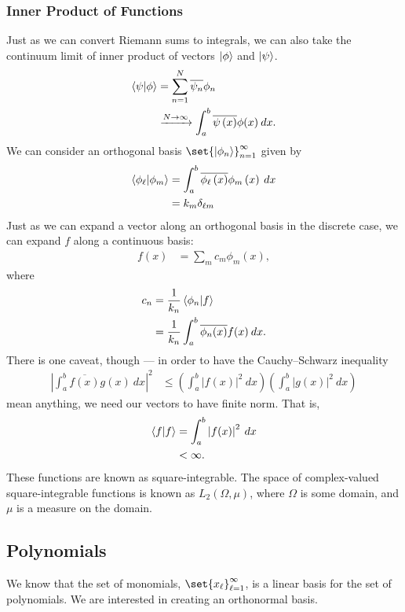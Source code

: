 \documentclass[10pt]{mypackage}
\begin{document}
\subsubsection{Inner Product of Functions}%
Just as we can convert Riemann sums to integrals, we can also take the continuum limit of inner product of vectors $\ket{\phi}$ and $\ket{\psi}$.
\begin{align*}
  \braket{\psi}{\phi} &= \sum_{n=1}^{N}\overline{\psi_n} \phi_n\\
                      &\xrightarrow{N\rightarrow\infty} \int_{a}^{b} \overline{\psi\left(x\right)}\phi(x)\:dx.
\end{align*}
We can consider an orthogonal basis $\set{\ket{\phi_n}}_{n=1}^{\infty}$ given by
\begin{align*}
  \braket{\phi_{\ell}}{\phi_{m}} &= \int_{a}^{b} \overline{\phi_{\ell}\left(x\right)} \phi_{m}\left(x\right)\:dx\\
                                 &= k_{m}\delta_{\ell m}
\end{align*}
Just as we can expand a vector along an orthogonal basis in the discrete case, we can expand $f$ along a continuous basis:
\begin{align*}
  f(x) &= \sum_{m}c_m\phi_{m}\left(x\right),
\end{align*}
where
\begin{align*}
  c_n &= \frac{1}{k_n}\braket{\phi_n}{f}\\
      &= \frac{1}{k_n}\int_{a}^{b} \overline{\phi_n(x)}f(x)\:dx.
\end{align*}
There is one caveat, though --- in order to have the Cauchy--Schwarz inequality
\begin{align*}
  \left\vert \int_{a}^{b} \overline{f(x)}g(x)\:dx \right\vert^2 &\leq \left(\int_{a}^{b} \left\vert f(x) \right\vert^2\:dx\right) \left(\int_{a}^{b} \left\vert g(x) \right\vert^2\:dx\right)
\end{align*}
mean anything, we need our vectors to have finite norm. That is,
\begin{align*}
  \braket{f}{f} &= \int_{a}^{b} \left\vert f(x) \right\vert^2\:dx\\
                &< \infty.
\end{align*}
These functions are known as square-integrable. The space of complex-valued square-integrable functions is known as $L_{2}\left(\Omega,\mu\right)$, where $\Omega$ is some domain, and $\mu$ is a measure on the domain.
\subsection{Polynomials}%
We know that the set of monomials, $\set{x_{\ell}}_{\ell=1}^{\infty}$, is a linear basis for the set of polynomials. We are interested in creating an orthonormal basis.
\end{document}
